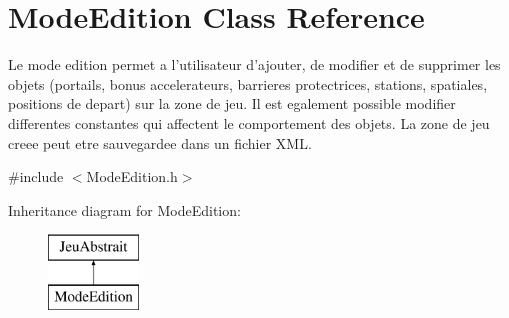 \hypertarget{class_mode_edition}{\section{Mode\-Edition Class Reference}
\label{class_mode_edition}
}


Le mode edition permet a l'utilisateur d'ajouter, de modifier et de supprimer les objets (portails, bonus accelerateurs, barrieres protectrices, stations, spatiales, positions de depart) sur la zone de jeu. Il est egalement possible modifier differentes constantes qui affectent le comportement des objets. La zone de jeu creee peut etre sauvegardee dans un fichier X\-M\-L.  




{\ttfamily \#include $<$Mode\-Edition.\-h$>$}

Inheritance diagram for Mode\-Edition\-:\begin{figure}[H]
\begin{center}
\leavevmode
\includegraphics[height=2.000000cm]{class_mode_edition}
\end{center}
\end{figure}
